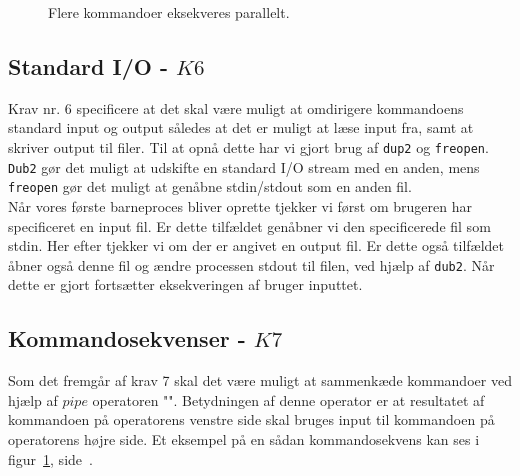 \documentclass{article}
\begin{document}
\begin{figure}[H]
\center
{}
\caption{Flere kommandoer eksekveres parallelt.}
\label{fig:background}
\end{figure}

\subsection{Standard I/O - $K6$}
Krav nr. 6 specificere at det skal være muligt at omdirigere kommandoens standard input og output således at det er muligt at læse input fra, samt at skriver output til filer. Til at opnå dette har vi gjort brug af \texttt{dup2} og \texttt{freopen}. \texttt{Dub2} gør det muligt at udskifte en standard I/O stream med en anden, mens \texttt{freopen} gør det muligt at genåbne stdin/stdout som en anden fil.\\
Når vores første barneproces bliver oprette tjekker vi først om brugeren har specificeret en input fil. Er dette tilfældet genåbner vi den specificerede fil som stdin. Her efter tjekker vi om der er angivet en output fil. Er dette også tilfældet åbner også denne fil og ændre processen stdout til filen, ved hjælp af \texttt{dub2}. Når dette er gjort fortsætter eksekveringen af bruger inputtet. 

\subsection{Kommandosekvenser - $K7$}
Som det fremgår af krav 7 skal det være muligt at sammenkæde kommandoer ved hjælp af $pipe$ operatoren "\textbar". Betydningen af denne operator er at resultatet af kommandoen på operatorens venstre side skal bruges input til kommandoen på operatorens højre side. Et eksempel på en sådan kommandosekvens kan ses i figur~\ref{fig:background}, side~\pageref{fig:background}.\\
\end{document}
